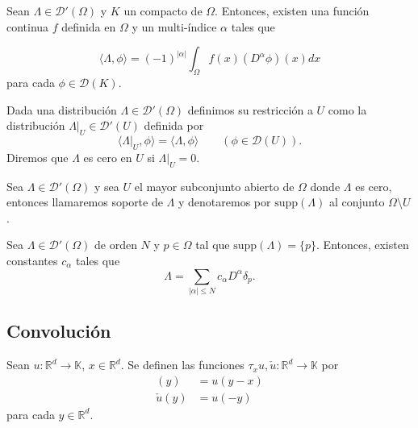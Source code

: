 \begin{teorema}
Sean $\Lambda\in \mathcal{D}'(\Omega)$ y $K$ un compacto de $\Omega$. Entonces, existen una función continua $f$ definida en $\Omega$ y un multi-índice $\alpha$ tales que 

\begin{equation}
\langle \Lambda , \phi\rangle = (-1)^{\vert\alpha\vert} \int_{\Omega}f(x)(D^{\alpha}\phi )(x)dx
\end{equation}
para cada $\phi\in \mathcal{D}(K)$.
\end{teorema}

\begin{definicion}
Dada una distribución $\Lambda\in\mathcal{D}'(\Omega)$ definimos su restricción a $U$ como la distribución  $\Lambda|_{U}\in\mathcal{D}'(U)$ definida por 
\begin{equation}
\langle\Lambda |_{U},\phi\rangle = \langle \Lambda, \phi\rangle \qquad (\phi \in \mathcal{D}(U)).
\end{equation}
Diremos que $\Lambda$ es cero en $U$ si $\Lambda |_{U} = 0$.
\end{definicion}

\begin{definicion}
Sea $\Lambda\in\mathcal{D}'(\Omega)$ y sea $U$ el mayor subconjunto abierto de $\Omega$ donde $\Lambda$ es cero, entonces llamaremos soporte de $\Lambda$ y denotaremos por  $\mathrm{supp}({\Lambda})$ al conjunto $\Omega\setminus U$.

\end{definicion}

\begin{teorema}\label{thm:d02}
Sea $\Lambda\in \mathcal{D}'(\Omega)$ de orden $N$ y $p\in\Omega$ tal que $\mathrm{supp}({\Lambda}) = \{p\} $. Entonces, existen constantes $c_{\alpha}$ tales que 
\begin{equation}
\Lambda = \sum_{\vert\alpha\vert \leq N} c_{\alpha} D^{\alpha}\delta_{p}.
\end{equation}
\end{teorema}
\subsection{Convolución}
\begin{definicion}
Sean $u:\mathds{R}^{d}\rightarrow \mathds{K}$, $x\in\mathds{R}^{d}$. Se definen las funciones $\tau_{x} u , \check{u}:\mathds{R}^{d}\rightarrow \mathds{K} $ por
\begin{align}
[\tau_{x} u ](y) & = u (y-x)\\
 \check{u}(y) & = u(-y) 
\end{align}
para cada $y\in\mathds{R}^{d}$.
\end{definicion}

